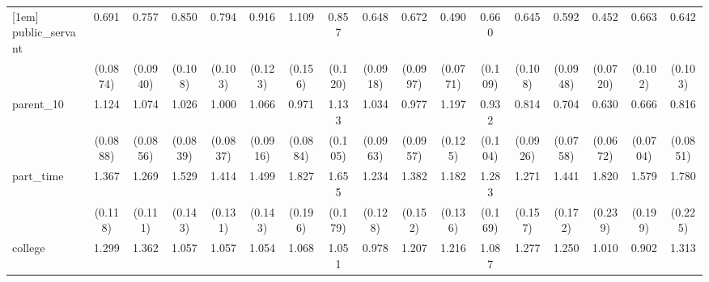 {\begin{tabular}{l*{16}{c}}
[1em]
public\_servant      &       0.691\sym{**} &       0.757\sym{*}  &       0.850         &       0.794         &       0.916         &       1.109         &       0.857         &       0.648\sym{**} &       0.672\sym{**} &       0.490\sym{***}&       0.660\sym{*}  &       0.645\sym{**} &       0.592\sym{**} &       0.452\sym{***}&       0.663\sym{**} &       0.642\sym{**} \\
                    &    (0.0874)         &    (0.0940)         &     (0.108)         &     (0.103)         &     (0.123)         &     (0.156)         &     (0.120)         &    (0.0918)         &    (0.0997)         &    (0.0771)         &     (0.109)         &     (0.108)         &    (0.0948)         &    (0.0720)         &     (0.102)         &     (0.103)         \\
[1em]
parent\_10           &       1.124         &       1.074         &       1.026         &       1.000         &       1.066         &       0.971         &       1.133         &       1.034         &       0.977         &       1.197         &       0.932         &       0.814         &       0.704\sym{**} &       0.630\sym{***}&       0.666\sym{***}&       0.816         \\
                    &    (0.0888)         &    (0.0856)         &    (0.0839)         &    (0.0837)         &    (0.0916)         &    (0.0884)         &     (0.105)         &    (0.0963)         &    (0.0957)         &     (0.125)         &     (0.104)         &    (0.0926)         &    (0.0758)         &    (0.0672)         &    (0.0704)         &    (0.0851)         \\
[1em]
part\_time           &       1.367\sym{***}&       1.269\sym{**} &       1.529\sym{***}&       1.414\sym{***}&       1.499\sym{***}&       1.827\sym{***}&       1.655\sym{***}&       1.234\sym{*}  &       1.382\sym{**} &       1.182         &       1.283         &       1.271         &       1.441\sym{**} &       1.820\sym{***}&       1.579\sym{***}&       1.780\sym{***}\\
                    &     (0.118)         &     (0.111)         &     (0.143)         &     (0.131)         &     (0.143)         &     (0.196)         &     (0.179)         &     (0.128)         &     (0.152)         &     (0.136)         &     (0.169)         &     (0.157)         &     (0.172)         &     (0.239)         &     (0.199)         &     (0.225)         \\
[1em]
college             &       1.299\sym{**} &       1.362\sym{**} &       1.057         &       1.057         &       1.054         &       1.068         &       1.051         &       0.978         &       1.207         &       1.216         &       1.087         &       1.277         &       1.250         &       1.010         &       0.902         &       1.313\sym{*}  \\

\end{tabular}}
